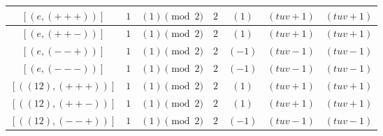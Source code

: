 \documentclass[11pt,english]{amsart}
\numberwithin{equation}{section}
\numberwithin{figure}{section}
\theoremstyle{plain}
\theoremstyle{plain}
\theoremstyle{definition}
\theoremstyle{remark}
\begin{document}
\begin{itemize}
\begin{table}[H]
\begin{tabular}{|c|c|c|c|c|c|c|}
        $[ (e, (+++)) ]$ & $1$ & $(1)\pmod 2$ & $2$ & 
        $(1)$ & 
        $(tuv+1)$ & 
        $(tuv+1)$ \\\hline
        
        $[ (e, (++-)) ]$ & $1$ & $(1)\pmod 2$ & $2$ & 
        $(1)$ & 
        $(tuv+1)$ & 
        $(tuv+1)$ \\\hline
        
        $[ (e, (--+)) ]$ & $1$ & $(1)\pmod 2$ & $2$ & 
        $(-1)$ & 
        $(tuv-1)$ & 
        $(tuv-1)$ \\\hline
        
        $[ (e, (---)) ]$ & $1$ & $(1)\pmod 2$ & $2$ & 
        $(-1)$ & 
        $(tuv-1)$ & 
        $(tuv-1)$ \\\hline
        
        $[ ((12), (+++)) ]$ & $1$ & $(1)\pmod 2$ & $2$ & 
        $(1)$ & 
        $(tuv+1)$ & 
        $(tuv+1)$ \\\hline
        
        $[ ((12), (++-)) ]$ & $1$ & $(1)\pmod 2$ & $2$ & 
        $(1)$ & 
        $(tuv+1)$ & 
        $(tuv+1)$ \\\hline
        
        $[ ((12), (--+)) ]$ & $1$ & $(1)\pmod 2$ & $2$ & 
        $(-1)$ & 
        $(tuv-1)$ & 
        $(tuv-1)$ \\\hline
        

\end{tabular}
\end{table}
\end{itemize}
\end{document}
